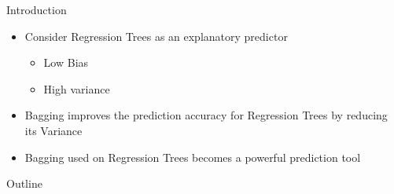 \documentclass{beamer}
\begin{document}
\begin{frame}{Introduction}
\begin{itemize}
\item Consider Regression Trees as an explanatory predictor
	\begin{itemize}
	\item Low Bias %
    \item High variance %
    
	\end{itemize}
\item Bagging improves the prediction accuracy for Regression Trees by reducing its Variance 
\item Bagging used on Regression Trees becomes a powerful prediction tool

\end{itemize}
% 
% 
% 
% 
% 
\end{frame}


\begin{frame}{Outline}
  \tableofcontents
\end{frame}


\end{document}
